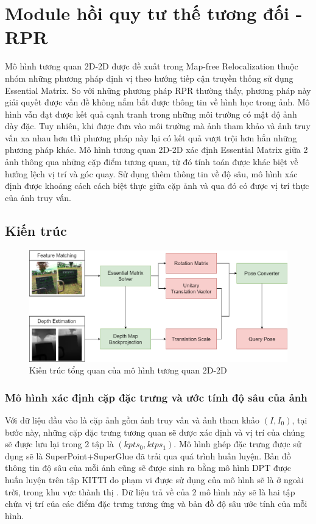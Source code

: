 \section{Module hồi quy tư thế tương đối - RPR}
Mô hình tương quan 2D-2D được đề xuất trong Map-free Relocalization \cite{arnold2022mapfree} thuộc nhóm những phương pháp định vị theo hướng tiếp cận truyền thống sử dụng Essential Matrix. So với những phương pháp RPR thường thấy, phương pháp này giải quyết được vấn đề không nắm bắt được thông tin về hình học trong ảnh. Mô hình vẫn đạt được kết quả cạnh tranh trong những môi trường có mật độ ảnh dày đặc. Tuy nhiên, khi được đưa vào môi trường mà ảnh tham khảo và ảnh truy vấn xa nhau hơn thì phương pháp này lại có kết quả vượt trội hơn hẳn những phương pháp khác. Mô hình tương quan 2D-2D xác định Essential Matrix giữa 2 ảnh thông qua những cặp điểm tương quan, từ đó tính toán được khác biệt về hướng lệch vị trí và góc quay. Sử dụng thêm thông tin về độ sâu, mô hình xác định được khoảng cách cách biệt thực giữa cặp ảnh và qua đó có được vị trí thực của ảnh truy vấn.

\subsection{Kiến trúc}

\begin{figure}[htbp]
  \centering
  \includegraphics[width=\textwidth]{pics/Proposal/2d_2d.png}
  \caption{Kiến trúc tổng quan của mô hình tương quan 2D-2D}
\end{figure}

\subsubsection{Mô hình xác định cặp đặc trưng và ước tính độ sâu của ảnh}

Với dữ liệu đầu vào là cặp ảnh gồm ảnh truy vấn và ảnh tham khảo $(I, I_0)$, tại bước này, những cặp đặc trưng tương quan sẽ được xác định và vị trí của chúng sẽ được lưu lại trong 2 tập là $(kpts_0, ktps_1)$. Mô hình ghép đặc trưng được sử dụng sẽ là SuperPoint+SuperGlue \cite{sarlin2020superglue} đã trải qua quá trình huấn luyện. Bản đồ thông tin độ sâu của mỗi ảnh cũng sẽ được sinh ra bằng mô hình DPT \cite{ranftl2021vision} được huấn luyện trên tập KITTI do phạm vi được sử dụng của mô hình sẽ là ở ngoài trời, trong khu vực thành thị \cite{arnold2022mapfree}. Dữ liệu trả về của 2 mô hình này sẽ là hai tập chứa vị trí của các điểm đặc trưng tương ứng và bản đồ độ sâu ước tính của mỗi hình.


